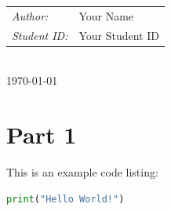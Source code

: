 \documentclass[12pt,a4paper]{report}
\begin{document}
\begin{titlepage}
    \begin{minipage}{0.4\textwidth}
        \begin{tabular}{l l}
            \emph{Author:\quad}     & Your Name       \\
            \emph{Student ID:\quad} & Your Student ID \\
        \end{tabular}

    \end{minipage}\\[2cm]


    {\large \today}\\[2cm]
    \vfill
\end{titlepage}


\tableofcontents
\newpage



\pagestyle{mypagestyle}


\section{Part 1}

This is an example code listing:

\begin{lstlisting}[language=Python, caption=Example Python code]
print("Hello World!")
\end{lstlisting}
\end{document}
